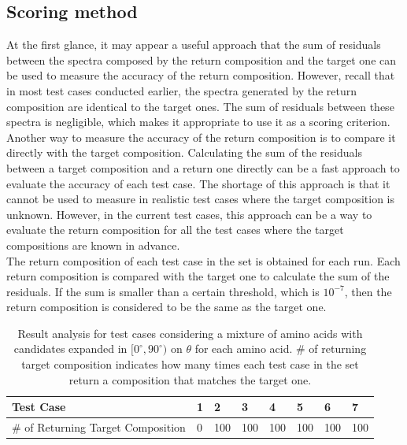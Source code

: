 \subsection{Scoring method}

At the first glance, it may appear a useful approach that the sum of residuals between the spectra composed by the return composition and the target one can be used to measure the accuracy of the return composition. However, recall that in most test cases conducted earlier, the spectra generated by the return composition are identical to the target ones. The sum of residuals between these spectra is negligible, which makes it appropriate to use it as a scoring criterion. \\

Another way to measure the accuracy of the return composition is to compare it directly with the target composition. Calculating the sum of the residuals between a target composition and a return one directly can be a fast approach to evaluate the accuracy of each test case. The shortage of this approach is that it cannot be used to measure in realistic test cases where the target composition is unknown. However, in the current test cases, this approach can be a way to evaluate the return composition for all the test cases where the target compositions are known in advance. \\

The return composition of each test case in the set is obtained for each run. Each return composition is compared with the target one to calculate the sum of the residuals. If the sum is smaller than a certain threshold, which is $10^{-7}$, then the return composition is considered to be the same as the target one. \\

\begin{table}[ht!]
\begin{center}
{\def\arraystretch{1.5}
\begin{tabular}{| l | l | l | l | l | l | l | l |}
\hline
Test Case & 1 & 2 & 3 & 4 & 5 & 6 & 7 \\ \hline
\# of Returning Target Composition& 0 & 100 & 100 & 100 & 100 & 100 & 100 \\ \hline
\end{tabular} 
}
\end{center}
\caption{Result analysis for test cases considering a mixture of amino acids with candidates expanded in $[0^{\circ}, 90^{\circ})$ on $\theta$ for each amino acid. \# of returning target composition indicates how many times each test case in the set return a composition that matches the target one.}
\label{tab:5.2}
\end{table}	

